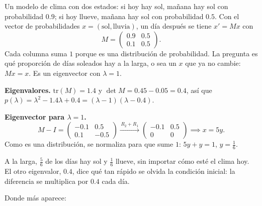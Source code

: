 \documentclass[11pt,letterpaper]{article}
\begin{document}
\begin{ejemplo}
    Un modelo de clima con dos estados: si hoy hay sol, mañana hay sol
    con probabilidad $0.9$; si hoy llueve, mañana hay sol con
    probabilidad $0.5$. Con el vector de probabilidades
    $x = (\text{sol}, \text{lluvia})$, un día después se tiene
    $x' = Mx$ con
    \[
        M = \begin{pmatrix} 0.9 & 0.5 \\ 0.1 & 0.5 \end{pmatrix} .
    \]
    Cada columna suma $1$ porque es una distribución de
    probabilidad. La pregunta es qué proporción de días soleados hay a
    la larga, o sea un $x$ que ya no cambie: $Mx = x$. Es un
    eigenvector con $\lambda = 1$.

    \textbf{Eigenvalores.} $\mathrm{tr}(M) = 1.4$ y
    $\det M = 0.45 - 0.05 = 0.4$, así que
    $p(\lambda) = \lambda^2 - 1.4\lambda + 0.4
    = (\lambda - 1)(\lambda - 0.4)$.

    \textbf{Eigenvector para $\lambda = 1$.}
    \[
        M - I = \begin{pmatrix} -0.1 & 0.5 \\ 0.1 & -0.5
        \end{pmatrix}
        \xrightarrow{\,R_2 + R_1\,}
        \begin{pmatrix} -0.1 & 0.5 \\ 0 & 0 \end{pmatrix}
        \implies x = 5y .
    \]
    Como es una distribución, se normaliza para que sume $1$:
    $5y + y = 1$, $y = \tfrac{1}{6}$.
\end{ejemplo}

\begin{resultado}
    A la larga, $\tfrac{5}{6}$ de los días hay sol y $\tfrac{1}{6}$
    llueve, sin importar cómo esté el clima hoy. El otro eigenvalor,
    $0.4$, dice qué tan rápido se olvida la condición inicial: la
    diferencia se multiplica por $0.4$ cada día.
\end{resultado}

Donde más aparece:
\end{document}
